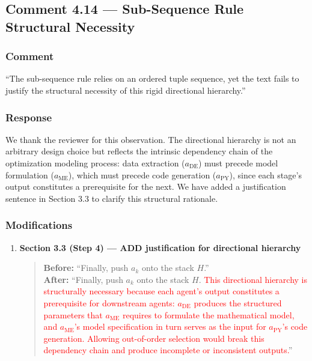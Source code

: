 \documentclass[11pt,a4paper]{article}
\newcommand{\changed}[1]{\textcolor{red}{#1}}
\begin{document}
\subsection{Comment 4.14 --- Sub-Sequence Rule Structural Necessity}

\subsubsection{Comment}
``The sub-sequence rule relies on an ordered tuple sequence, yet the text fails to justify the structural necessity of this rigid directional hierarchy.''

\subsubsection{Response}
We thank the reviewer for this observation. The directional hierarchy is not an arbitrary design choice but reflects the intrinsic dependency chain of the optimization modeling process: data extraction ($a_{\text{DE}}$) must precede model formulation ($a_{\text{ME}}$), which must precede code generation ($a_{\text{PY}}$), since each stage's output constitutes a prerequisite for the next. We have added a justification sentence in Section 3.3 to clarify this structural rationale.

\subsubsection{Modifications}
\begin{enumerate}
\item \textbf{Section 3.3 (Step 4) --- ADD justification for directional hierarchy}
\begin{quote}
\textbf{Before:} ``Finally, push $a_k$ onto the stack $H$.''\\[4pt]
\textbf{After:} ``Finally, push $a_k$ onto the stack $H$. \changed{This directional hierarchy is structurally necessary because each agent's output constitutes a prerequisite for downstream agents: $a_{\text{DE}}$ produces the structured parameters that $a_{\text{ME}}$ requires to formulate the mathematical model, and $a_{\text{ME}}$'s model specification in turn serves as the input for $a_{\text{PY}}$'s code generation. Allowing out-of-order selection would break this dependency chain and produce incomplete or inconsistent outputs.}''
\end{quote}
\end{enumerate}
\end{document}
